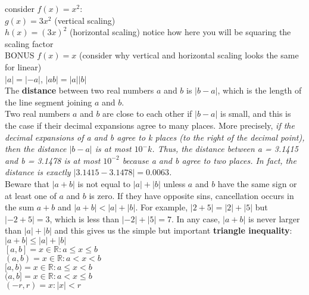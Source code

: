 \documentclass{article}
\begin{document}
consider $f(x) = x^2$:\\
$g(x) = 3x^2$ (vertical scaling)\\
$h(x) = (3x)^2$ (horizontal scaling) notice how here you will be squaring the scaling factor\\

BONUS $f(x) = x$ (consider why vertical and horizontal scaling looks the same for linear)\\

$\lvert a\rvert = \lvert -a\rvert$, $\lvert ab\rvert = \lvert a\rvert\lvert b\rvert$\\
The \textbf{distance} between two real numbers $a$ and $b$ is $\lvert b - a \rvert$, which is the length of the line segment joining $a$ and $b$.\\
Two real numbers $a$ and $b$ are close to each other if $\lvert b - a\rvert$ is small, and this is the case if their decimal expansions agree to many places. More precisely, \textit{if the decimal expansions of a and b agree to k places (to the right of the decimal point), then the distance $\lvert b - a\rvert$ is at most $10^-k$. Thus, the distance between a = 3.1415 and b = 3.1478 is at most $10^{-2}$ because a and b agree to two places. In fact, the distance is exactly $\lvert3.1415 - 3.1478\rvert = 0.0063$.}\\
Beware that $\lvert a + b\rvert$ is not equal to $\lvert a\rvert + \lvert b\rvert$ unless $a$ and $b$ have the same sign or at least one of $a$ and $b$ is zero. If they have opposite sins, cancellation occurs in the sum $a + b$ and $\lvert a+b\rvert < \lvert a\rvert + \lvert b\rvert$. For example, $\lvert 2 + 5\rvert = \lvert2\rvert + \lvert5\rvert$ but $\lvert-2 + 5\rvert = 3$, which is less than $\lvert-2\rvert + \lvert5\rvert = 7$. In any case, $\lvert a + b\rvert$ is never larger than $\lvert a\rvert + \lvert b\rvert$ and this gives us the simple but important \textbf{triangle inequality}: $\lvert a + b\rvert \leq \lvert a\rvert + \lvert b\rvert$\\

$[a, b] = {x \in \mathbb{R} : a \leq x \leq b}$\\
$(a, b) = {x \in \mathbb{R} : a < x < b}$\\
$[a, b) = {x \in \mathbb{R} : a \leq x < b}$\\
$(a, b] = {x \in \mathbb{R} : a < x \leq b}$\\
$(-r, r) = {x : \lvert x\rvert < r}$\\
\end{document}
